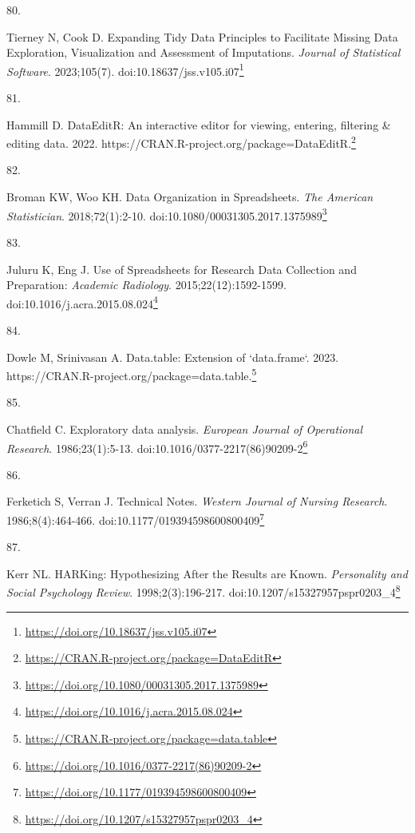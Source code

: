 \documentclass[
  a4paper,
]{book}
\newlength{\cslhangindent}
\newlength{\csllabelwidth}
\newlength{\cslentryspacingunit} %
\newenvironment{CSLReferences}[2] %
 {%
  \setlength{\parindent}{0pt}
  \ifodd #1
  \let\oldpar\par
  \def\par{\hangindent=\cslhangindent\oldpar}
  \fi
  \setlength{\parskip}{#2\cslentryspacingunit}
 }%
 {}
\newcommand{\CSLLeftMargin}[1]{\parbox[t]{\csllabelwidth}{#1}}
\newcommand{\CSLRightInline}[1]{\parbox[t]{\linewidth - \csllabelwidth}{#1}\break}
\renewcommand{\href}[2]{#2\footnote{\url{#1}}}
\begin{document}
\begin{CSLReferences}{0}{0}
\leavevmode{}%
\CSLLeftMargin{80. }%
\CSLRightInline{Tierney N, Cook D. Expanding Tidy Data Principles to Facilitate Missing Data Exploration, Visualization and Assessment of Imputations. \emph{Journal of Statistical Software}. 2023;105(7). doi:\href{https://doi.org/10.18637/jss.v105.i07}{10.18637/jss.v105.i07}}

\leavevmode{}%
\CSLLeftMargin{81. }%
\CSLRightInline{Hammill D. DataEditR: An interactive editor for viewing, entering, filtering \& editing data. 2022. \href{https://CRAN.R-project.org/package=DataEditR}{https://CRAN.R-project.org/package=DataEditR.}}

\leavevmode{}%
\CSLLeftMargin{82. }%
\CSLRightInline{Broman KW, Woo KH. Data Organization in Spreadsheets. \emph{The American Statistician}. 2018;72(1):2-10. doi:\href{https://doi.org/10.1080/00031305.2017.1375989}{10.1080/00031305.2017.1375989}}

\leavevmode{}%
\CSLLeftMargin{83. }%
\CSLRightInline{Juluru K, Eng J. Use of Spreadsheets for Research Data Collection and Preparation: \emph{Academic Radiology}. 2015;22(12):1592-1599. doi:\href{https://doi.org/10.1016/j.acra.2015.08.024}{10.1016/j.acra.2015.08.024}}

\leavevmode{}%
\CSLLeftMargin{84. }%
\CSLRightInline{Dowle M, Srinivasan A. Data.table: Extension of `data.frame`. 2023. \href{https://CRAN.R-project.org/package=data.table}{https://CRAN.R-project.org/package=data.table.}}

\leavevmode{}%
\CSLLeftMargin{85. }%
\CSLRightInline{Chatfield C. Exploratory data analysis. \emph{European Journal of Operational Research}. 1986;23(1):5-13. doi:\href{https://doi.org/10.1016/0377-2217(86)90209-2}{10.1016/0377-2217(86)90209-2}}

\leavevmode{}%
\CSLLeftMargin{86. }%
\CSLRightInline{Ferketich S, Verran J. Technical Notes. \emph{Western Journal of Nursing Research}. 1986;8(4):464-466. doi:\href{https://doi.org/10.1177/019394598600800409}{10.1177/019394598600800409}}

\leavevmode{}%
\CSLLeftMargin{87. }%
\CSLRightInline{Kerr NL. HARKing: Hypothesizing After the Results are Known. \emph{Personality and Social Psychology Review}. 1998;2(3):196-217. doi:\href{https://doi.org/10.1207/s15327957pspr0203_4}{10.1207/s15327957pspr0203\_4}}


\end{CSLReferences}
\end{document}
